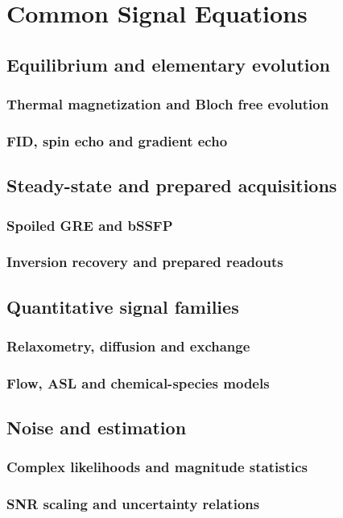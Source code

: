 \chapter{Common Signal Equations}
\label{app:c}

\section{Equilibrium and elementary evolution}
\label{sec:c:equilibrium-and-elementary-evolution}
\subsection{Thermal magnetization and Bloch free evolution}
\subsection{FID, spin echo and gradient echo}

\section{Steady-state and prepared acquisitions}
\label{sec:c:steady-state-and-prepared-acquisitions}
\subsection{Spoiled GRE and bSSFP}
\subsection{Inversion recovery and prepared readouts}

\section{Quantitative signal families}
\label{sec:c:quantitative-signal-families}
\subsection{Relaxometry, diffusion and exchange}
\subsection{Flow, ASL and chemical-species models}

\section{Noise and estimation}
\label{sec:c:noise-and-estimation}
\subsection{Complex likelihoods and magnitude statistics}
\subsection{SNR scaling and uncertainty relations}
